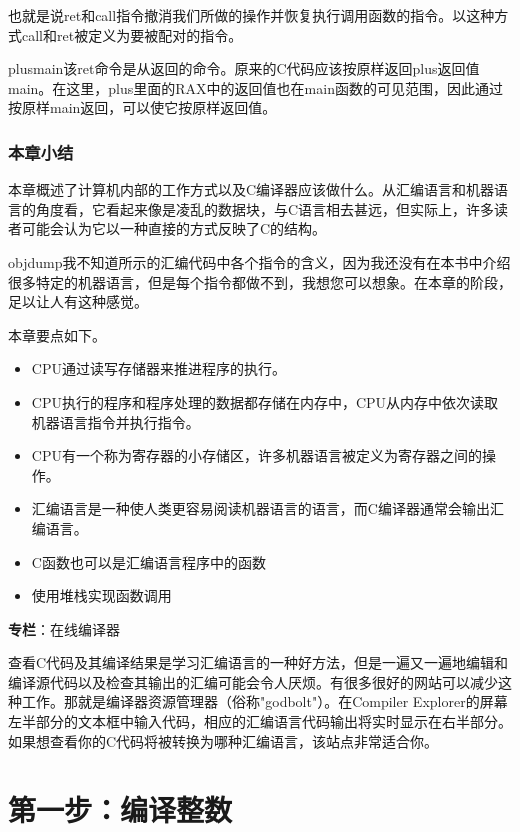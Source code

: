 \documentclass[cn,10pt,math=newtx,citestyle=gb7714-2015,bibstyle=gb7714-2015]{elegantbook}
\begin{document}
也就是说ret和call指令撤消我们所做的操作并恢复执行调用函数的指令。以这种方式call和ret被定义为要被配对的指令。

plusmain该ret命令是从返回的命令。原来的C代码应该按原样返回plus返回值main。在这里，plus里面的RAX中的返回值也在main函数的可见范围，因此通过按原样main返回，可以使它按原样返回值。

\subsection{本章小结}

本章概述了计算机内部的工作方式以及C编译器应该做什么。从汇编语言和机器语言的角度看，它看起来像是凌乱的数据块，与C语言相去甚远，但实际上，许多读者可能会认为它以一种直接的方式反映了C的结构。

objdump我不知道所示的汇编代码中各个指令的含义，因为我还没有在本书中介绍很多特定的机器语言，但是每个指令都做不到，我想您可以想象。在本章的阶段，足以让人有这种感觉。

本章要点如下。

\begin{itemize}
  \item CPU通过读写存储器来推进程序的执行。
  \item CPU执行的程序和程序处理的数据都存储在内存中，CPU从内存中依次读取机器语言指令并执行指令。
  \item CPU有一个称为寄存器的小存储区，许多机器语言被定义为寄存器之间的操作。
  \item 汇编语言是一种使人类更容易阅读机器语言的语言，而C编译器通常会输出汇编语言。
  \item C函数也可以是汇编语言程序中的函数
  \item 使用堆栈实现函数调用
\end{itemize}

\begin{tcolorbox}
    \begin{tcolorbox}
        \textbf{专栏}：在线编译器

        查看C代码及其编译结果是学习汇编语言的一种好方法，但是一遍又一遍地编辑和编译源代码以及检查其输出的汇编可能会令人厌烦。有很多很好的网站可以减少这种工作。那就是编译器资源管理器（俗称"godbolt"）。在Compiler Explorer的屏幕左半部分的文本框中输入代码，相应的汇编语言代码输出将实时显示在右半部分。如果想查看你的C代码将被转换为哪种汇编语言，该站点非常适合你。
    \end{tcolorbox}
\end{tcolorbox}

\chapter{第一步：编译整数}
\end{document}
